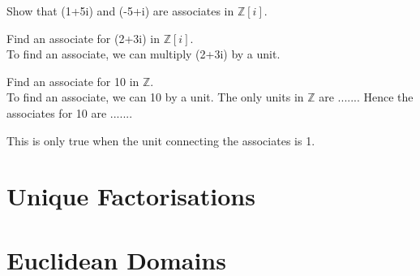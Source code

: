 \begin{example}
Show that (1+5i) and (-5+i) are associates in $\mathbb{Z}[i]$.
\end{example}

\begin{example}
Find an associate for (2+3i) in $\mathbb{Z}[i]$. \\
To find an associate, we can multiply (2+3i) by a unit.
\end{example}

\begin{example}
Find an associate for 10 in $\mathbb{Z}$.  \\
To find an associate, we can 10 by a unit. The only units in $\mathbb{Z}$ are ....... 
Hence the associates for 10 are .......
\end{example}


This is only true when the unit connecting the associates is 1. 


\section{Unique Factorisations}


\section{Euclidean Domains}

